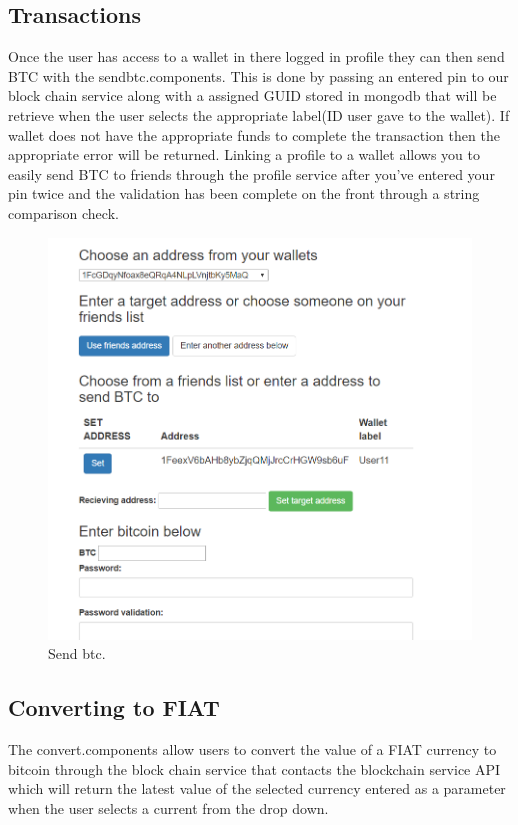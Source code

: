 \subsection{Transactions}
Once the user has access to a wallet in there logged in profile they can then send BTC with the sendbtc.components. This is done by passing an entered pin to our block chain service along with a assigned GUID stored in mongodb that will be retrieve when the user selects the appropriate label(ID user gave to the wallet). If wallet does not have the appropriate funds to complete the transaction then the appropriate error will be returned. Linking a profile to a wallet allows you to easily send BTC to friends through the profile service after you've entered your pin twice and the validation has been complete on the front through a string comparison check. 

\begin{figure}[H]
\centering
\includegraphics[]{img/sendbtc.png}
\caption{Send btc.}
\end{figure}

\subsection{Converting to FIAT}
The convert.components allow users to convert the value of a FIAT currency to bitcoin through the block chain service that contacts the blockchain service API which will return the latest value of the selected currency entered as a parameter when the user selects a current from the drop down.

